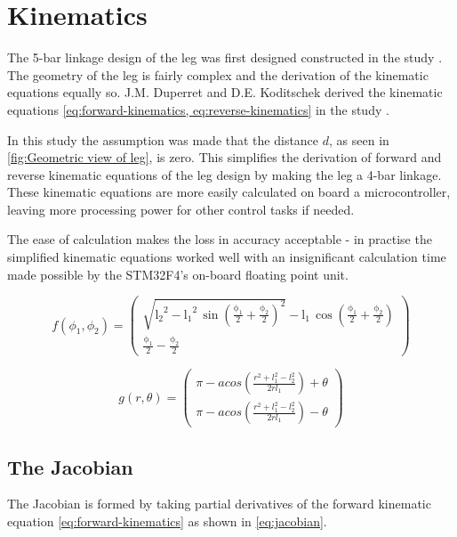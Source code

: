 \chapter{Kinematics}

The 5-bar linkage design of the leg was first designed constructed in the study \cite{Duperret}. The geometry of the leg is fairly complex and the derivation of the kinematic equations equally so. J.M. Duperret and D.E. Koditschek derived the kinematic equations \cref{eq:forward-kinematics, eq:reverse-kinematics} in the study \cite{Duperret}. 

In this study the assumption was made that the distance $d$, as seen in \cref{fig:Geometric view of leg}, is zero. This simplifies the derivation of forward and reverse kinematic equations of the leg design by making the leg a 4-bar linkage. These kinematic equations are more easily calculated on board a microcontroller\cite{Duperret}, leaving more processing power for other control tasks if needed. 

The ease of calculation makes the loss in accuracy acceptable - in practise the simplified kinematic equations worked well with an insignificant calculation time made possible by the STM32F4's on-board floating point unit.

\begin{equation} \label{eq:forward-kinematics}
f(\phi_1, \phi_2) = \left(\begin{array}{c} \sqrt{{\mathrm{l_2}}^2 - {\mathrm{l_1}}^2\, {\sin\!\left(\frac{\mathrm{\phi_1}}{2} + \frac{\mathrm{\phi_2}}{2}\right)}^2} - \mathrm{l_1}\, \cos\!\left(\frac{\mathrm{\phi_1}}{2} + \frac{\mathrm{\phi_2}}{2}\right)\\
\frac{\mathrm{\phi_1}}{2} - \frac{\mathrm{\phi_2}}{2} \end{array}\right)
\end{equation}

\begin{equation} \label{eq:reverse-kinematics}
g(r, \theta) = \left(\begin{array}{c} \pi - acos(\frac{r^2 + l_1^2 - l_2^2}{2rl_1}) + \theta \\
\pi - acos(\frac{r^2 + l_1^2 - l_2^2}{2rl_1}) - \theta  \end{array}\right)
\end{equation}

\section{The Jacobian}
The Jacobian is formed by taking partial derivatives of the forward kinematic equation \cref{eq:forward-kinematics} as shown in \cref{eq:jacobian}. 

